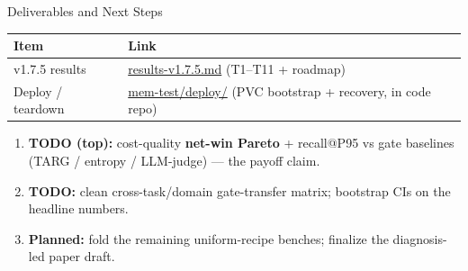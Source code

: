 \begin{frame}{Deliverables and Next Steps}
  \small
  \begin{tabular}{p{}p{}}
    \toprule
    Item & Link \\
    \midrule
    v1.7.5 results &
    \href{https://github.com/BDeMo/research-notes/blob/main/notes/plans/08-model-outputs-delta-w/papers/paper-b-forgetting-gating/results-v1.7.5/results-v1.7.5.md}{results-v1.7.5.md} (T1--T11 + roadmap) \\
    Deploy / teardown &
    \href{https://github.com/BDeMo/research-notes/blob/main/notes/plans/08-model-outputs-delta-w/papers/paper-b-forgetting-gating/results-v1.7.5/results-v1.7.5.md}{mem-test/deploy/} (PVC bootstrap + recovery, in code repo) \\
    \bottomrule
  \end{tabular}
  \vspace{0.5em}
  \begin{enumerate}
    \item \textbf{TODO (top):} cost-quality \textbf{net-win Pareto} + recall@P95 vs gate baselines (TARG / entropy / LLM-judge) --- the payoff claim.
    \item \textbf{TODO:} clean cross-task/domain gate-transfer matrix; bootstrap CIs on the headline numbers.
    \item \textbf{Planned:} fold the remaining uniform-recipe benches; finalize the diagnosis-led paper draft.
  \end{enumerate}
\end{frame}
